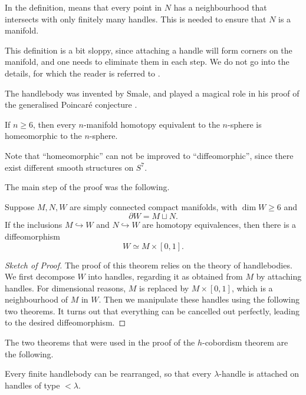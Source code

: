 In the definition,  means that 
every point in $N$ has a neighbourhood that intersects 
with only finitely many handles.
This is needed to ensure that $N$ is a manifold.

This definition is a bit sloppy,
since attaching a handle will form corners on the manifold,
and one needs to eliminate them in each step.
We do not go into the details,
for which the reader is referred to \cite{wall}.

The handlebody was invented by Smale,
and played a magical role in his proof of the
generalised Poincar\'e conjecture \cite{smale}.

\begin{theorem}
    If $n\geq6$, then every $n$-manifold
    homotopy equivalent to the $n$-sphere
    is homeomorphic to the $n$-sphere.
\end{theorem}

Note that ``homeomorphic'' can not be improved to ``diffeomorphic'',
since there exist different smooth structures on $S^7$.

The main step of the proof was the following.

\begin{theorem}
    Suppose $M,N,W$ are simply connected compact manifolds, with $\dim W\geq6$ and 
    \[ \partial W = M \sqcup N. \]
    If the inclusions $M\hookrightarrow W$ and $N\hookrightarrow W$
    are homotopy equivalences, then there is a diffeomorphism
    \[ W \simeq M \times [0,1]. \]
\end{theorem}

\begin{proof}[Sketch of Proof]
    The proof of this theorem relies on the theory of handlebodies.
    We first decompose $W$ into handles,
    regarding it as obtained from $M$ by attaching handles.
    For dimensional reasons, $M$ is replaced by $M\times[0,1]$,
    which is a neighbourhood of $M$ in $W$.
    Then we manipulate these handles using the following two theorems.
    It turns out that everything can be cancelled out perfectly,
    leading to the desired diffeomorphism.
\end{proof}

The two theorems that were used in the proof 
of the $h$-cobordism theorem are the following.

\begin{theorem}[Rearrangement] \label{thm-rearrangement}
    Every finite handlebody can be rearranged,
    so that every $\lambda$-handle is attached on handles
    of type $<\lambda$.
\end{theorem}

